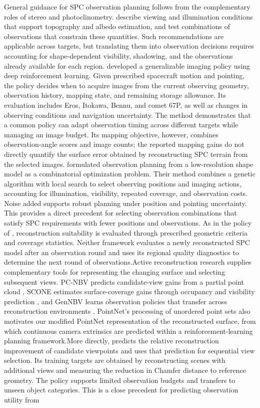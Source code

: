 General guidance for SPC observation planning follows from the complementary roles of stereo and photoclinometry. \citet{palmer2022} describe viewing and illumination conditions that support topography and albedo estimation, and \citet{palmer2024geometry} test combinations of observations that constrain these quantities. Such recommendations are applicable across targets, but translating them into observation decisions requires accounting for shape-dependent visibility, shadowing, and the observations already available for each region.\citet{piccinin2022} developed a generalizable imaging policy using deep reinforcement learning. Given prescribed spacecraft motion and pointing, the policy decides when to acquire images from the current observing geometry, observation history, mapping state, and remaining storage allowance. Its evaluation includes Eros, Itokawa, Bennu, and comet 67P, as well as changes in observing conditions and navigation uncertainty. The method demonstrates that a common policy can adapt observation timing across different targets while managing an image budget. Its mapping objective, however, combines observation-angle scores and image counts; the reported mapping gains do not directly quantify the surface error obtained by reconstructing SPC terrain from the selected images.\citet{wang2025} formulated observation planning from a low-resolution shape model as a combinatorial optimization problem. Their method combines a genetic algorithm with local search to select observing positions and imaging actions, accounting for illumination, visibility, repeated coverage, and observation costs. Noise added supports robust planning under position and pointing uncertainty. This provides a direct precedent for selecting observation combinations that satisfy SPC requirements with fewer positions and observations. As in the policy of \citet{piccinin2022}, reconstruction suitability is evaluated through prescribed geometric criteria and coverage statistics. Neither framework evaluates a newly reconstructed SPC model after an observation round and uses its regional quality diagnostics to determine the next round of observations.Active reconstruction research supplies complementary tools for representing the changing surface and selecting subsequent views. PC-NBV predicts candidate-view gains from a partial point cloud \citep{zeng2020}, SCONE estimates surface-coverage gains through occupancy and visibility prediction \citep{guedon2022}, and GenNBV learns observation policies that transfer across reconstruction environments \citep{chen2024}. PointNet's processing of unordered point sets \citep{qi2017pointnet} also motivates our modified PointNet representation of the reconstructed surface, from which continuous camera extrinsics are predicted within a reinforcement-learning planning framework.More directly, \citet{frahm2025vinnbv} predicts the relative reconstruction improvement of candidate viewpoints and uses that prediction for sequential view selection. Its training targets are obtained by reconstructing scenes with additional views and measuring the reduction in Chamfer distance to reference geometry. The policy supports limited observation budgets and transfers to unseen object categories. This is a close precedent for predicting observation utility from 
